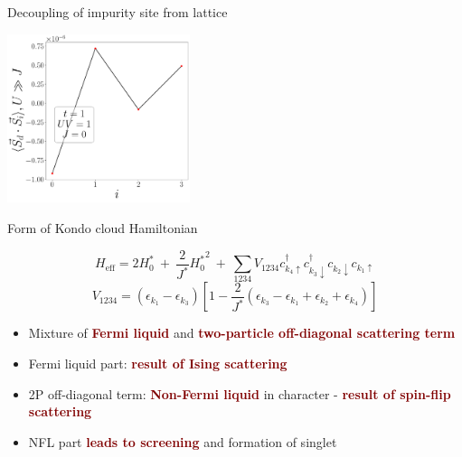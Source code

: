 \documentclass[aspectratio=169]{beamer}
\newcommand{\focus}[1]{\textcolor{maroon}{\textbf{#1}}}
\begin{document}
\begin{frame}[noframenumbering]{Decoupling of impurity site from lattice}
{\begin{center}
\hspace*{\fill}
\includegraphics[width=0.4\textwidth]{figures/corr-di-max-t=1.000,V=1_over_U,J=0,N=4,U=0.010,100.000,100.pdf}
\hspace*{\fill}
\end{center}
}
\end{frame}

\begin{frame}[noframenumbering]{Form of Kondo cloud Hamiltonian}
	
\centering
\[H_\text{eff}=2H^{*}_{0} ~+~ \frac{2}{J^*}{H^{*}_{0}}^2 ~+~ \sum_{1234}V_{1234}c^\dagger_{{k_4} \uparrow}c^\dagger_{{k_3} \downarrow}c_{{k_2} \downarrow}c_{{k_1} \uparrow}\label{eff_Ham_Kondo}\]
\[V_{1234} = \left( \epsilon_{k_1} - \epsilon_{k_3} \right)\left[1 - \frac{2}{J^*}\left(\epsilon_{k_3} - \epsilon_{{k_1}} + \epsilon_{{k_2}} + \epsilon_{{k_4}}\right)\right]\]

\begin{itemize}
	\item Mixture of \focus{Fermi liquid} and \focus{two-particle off-diagonal scattering term}
		\vspace*{\fill}
	\item Fermi liquid part: \focus{result of Ising scattering}
		\vspace*{\fill}
	\item 2P off-diagonal term: \focus{Non-Fermi liquid} in character - \focus{result of spin-flip scattering}
		\vspace*{\fill}
	\item NFL part \focus{leads to screening} and formation of singlet
\end{itemize}

\end{frame}
\end{document}

